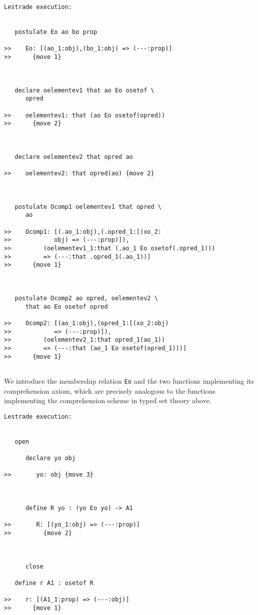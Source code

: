 \documentclass[12pt]{article}
\begin{document}
\begin{verbatim}Lestrade execution:


   postulate Eo ao bo prop

>>    Eo: [(ao_1:obj),(bo_1:obj) => (---:prop)]
>>      {move 1}



   declare oelementev1 that ao Eo osetof \
      opred

>>    oelementev1: that (ao Eo osetof(opred))
>>      {move 2}



   declare oelementev2 that opred ao

>>    oelementev2: that opred(ao) {move 2}



   postulate Ocomp1 oelementev1 that opred \
      ao

>>    Ocomp1: [(.ao_1:obj),(.opred_1:[(xo_2:
>>            obj) => (---:prop)]),
>>         (oelementev1_1:that (.ao_1 Eo osetof(.opred_1)))
>>         => (---:that .opred_1(.ao_1))]
>>      {move 1}



   postulate Ocomp2 ao opred, oelementev2 \
      that ao Eo osetof opred

>>    Ocomp2: [(ao_1:obj),(opred_1:[(xo_2:obj)
>>            => (---:prop)]),
>>         (oelementev2_1:that opred_1(ao_1))
>>         => (---:that (ao_1 Eo osetof(opred_1)))]
>>      {move 1}


\end{verbatim}

We introduce the membership relation {\tt Eo} and the two functions implementing its comprehension axiom, which are precisely analogous to the functions implementing the comprehension scheme in typed set theory above.

\begin{verbatim}Lestrade execution:


   open

      declare yo obj

>>       yo: obj {move 3}



      define R yo : (yo Eo yo) -> A1

>>       R: [(yo_1:obj) => (---:prop)]
>>         {move 2}



      close

   define r A1 : osetof R

>>    r: [(A1_1:prop) => (---:obj)]
>>      {move 1}


\end{verbatim}
\end{document}
